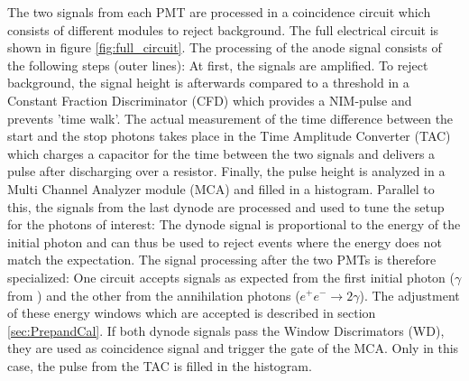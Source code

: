 \documentclass[
	paper=A4,
	parskip=full,
	chapterprefix=true,
	11pt,
	headings=normal,
	bibliography=totoc,
	listof=totoc,
	titlepage=on,
]{scrreprt}
\begin{document}
The two signals from each PMT are processed in a coincidence circuit which consists of different modules to reject background. The full electrical circuit is shown in figure \ref{fig:full_circuit}. The processing of the anode signal consists of the following steps (outer lines): At first, the signals are amplified. To reject background, the signal height is afterwards compared to a threshold in a Constant Fraction Discriminator (CFD) which provides a NIM-pulse and prevents 'time walk'\cite{Lab_manual_T8}. The actual measurement of the time difference between the start and the stop photons takes place in the Time Amplitude Converter (TAC) which charges a capacitor for the time between the two signals and delivers a pulse after discharging over a resistor. Finally, the pulse height is analyzed in a Multi Channel Analyzer module (MCA) and filled in a histogram. Parallel to this, the signals from the last dynode are processed and used to tune the setup for the photons of interest: The dynode signal is proportional to the energy of the initial photon and can thus be used to reject events where the energy does not match the expectation. The signal processing after the two PMTs is therefore specialized: One circuit accepts signals as expected from the first initial photon ($\gamma$ from ) and the other from the annihilation photons ($e^+e^- \rightarrow 2\gamma$). The adjustment of these energy windows which are accepted is described in section \ref{sec:PrepandCal}. If both dynode signals pass the Window Discrimators (WD), they are used as coincidence signal and trigger the gate of the MCA. Only in this case, the pulse from the TAC is filled in the histogram. 
\end{document}
